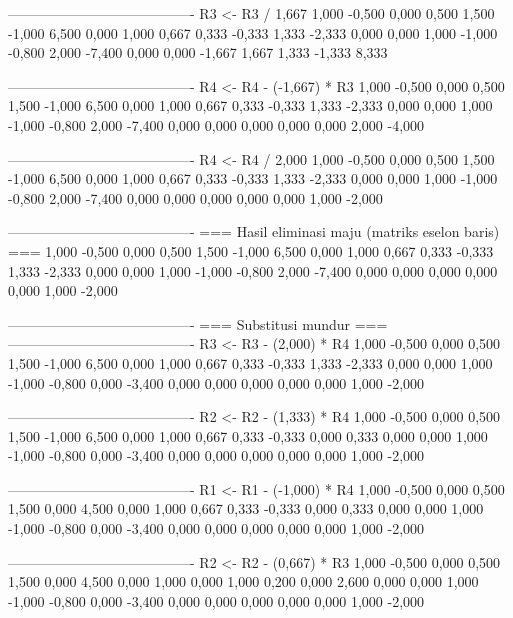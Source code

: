 \documentclass[12pt]{article}
\begin{document}
\begin{enumerate}
\begin{keluaran}
----------------------------------------
R3 <- R3 / 1,667
1,000   -0,500  0,000   0,500   1,500   -1,000  6,500
0,000   1,000   0,667   0,333   -0,333  1,333   -2,333
0,000   0,000   1,000   -1,000  -0,800  2,000   -7,400
0,000   0,000   -1,667  1,667   1,333   -1,333  8,333

----------------------------------------
R4 <- R4 - (-1,667) * R3
1,000   -0,500  0,000   0,500   1,500   -1,000  6,500
0,000   1,000   0,667   0,333   -0,333  1,333   -2,333
0,000   0,000   1,000   -1,000  -0,800  2,000   -7,400
0,000   0,000   0,000   0,000   0,000   2,000   -4,000

----------------------------------------
R4 <- R4 / 2,000
1,000   -0,500  0,000   0,500   1,500   -1,000  6,500
0,000   1,000   0,667   0,333   -0,333  1,333   -2,333
0,000   0,000   1,000   -1,000  -0,800  2,000   -7,400
0,000   0,000   0,000   0,000   0,000   1,000   -2,000

----------------------------------------
=== Hasil eliminasi maju (matriks eselon baris) ===
1,000   -0,500  0,000   0,500   1,500   -1,000  6,500
0,000   1,000   0,667   0,333   -0,333  1,333   -2,333
0,000   0,000   1,000   -1,000  -0,800  2,000   -7,400
0,000   0,000   0,000   0,000   0,000   1,000   -2,000

----------------------------------------
=== Substitusi mundur ===
----------------------------------------
R3 <- R3 - (2,000) * R4
1,000   -0,500  0,000   0,500   1,500   -1,000  6,500
0,000   1,000   0,667   0,333   -0,333  1,333   -2,333
0,000   0,000   1,000   -1,000  -0,800  0,000   -3,400
0,000   0,000   0,000   0,000   0,000   1,000   -2,000

----------------------------------------
R2 <- R2 - (1,333) * R4
1,000   -0,500  0,000   0,500   1,500   -1,000  6,500
0,000   1,000   0,667   0,333   -0,333  0,000   0,333
0,000   0,000   1,000   -1,000  -0,800  0,000   -3,400
0,000   0,000   0,000   0,000   0,000   1,000   -2,000

----------------------------------------
R1 <- R1 - (-1,000) * R4
1,000   -0,500  0,000   0,500   1,500   0,000   4,500
0,000   1,000   0,667   0,333   -0,333  0,000   0,333
0,000   0,000   1,000   -1,000  -0,800  0,000   -3,400
0,000   0,000   0,000   0,000   0,000   1,000   -2,000

----------------------------------------
R2 <- R2 - (0,667) * R3
1,000   -0,500  0,000   0,500   1,500   0,000   4,500
0,000   1,000   0,000   1,000   0,200   0,000   2,600
0,000   0,000   1,000   -1,000  -0,800  0,000   -3,400
0,000   0,000   0,000   0,000   0,000   1,000   -2,000


\end{keluaran}
\end{enumerate}
\end{document}
